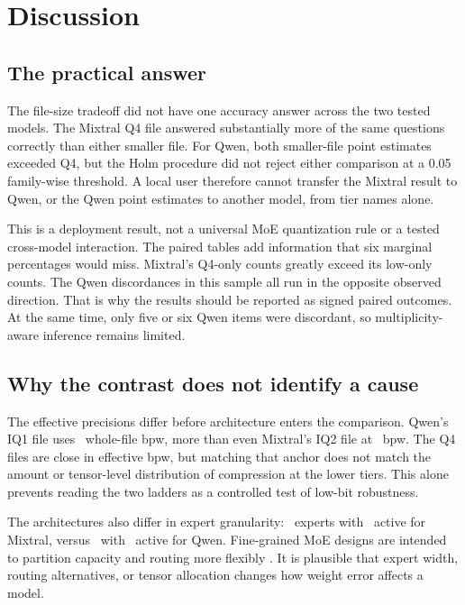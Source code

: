 \documentclass[11pt]{article}
\begin{document}
\section{Discussion}

\subsection{The practical answer}

The file-size tradeoff did not have one accuracy answer across the two tested
models. The Mixtral Q4 file answered substantially more of the same questions
correctly than either smaller file. For Qwen, both smaller-file point
estimates exceeded Q4, but the Holm procedure did not reject either comparison
at a 0.05 family-wise threshold. A local user therefore cannot transfer the
Mixtral result to Qwen, or the Qwen point estimates to another model, from
tier names alone.

This is a deployment result, not a universal MoE quantization rule or a tested
cross-model interaction. The paired tables add information that six marginal
percentages would miss.
Mixtral's Q4-only counts greatly exceed its low-only counts. The Qwen
discordances in this sample all run in the opposite observed direction. That
is why the results should be reported as signed paired outcomes. At the same
time, only five or six Qwen items were discordant, so multiplicity-aware
inference remains limited.

\subsection{Why the contrast does not identify a cause}

The effective precisions differ before architecture enters the comparison.
Qwen's IQ1 file uses \PfourQwenMoeIqOneEffectiveBpw\ whole-file bpw,
more than even Mixtral's IQ2 file at \PfourMixtralIqTwoEffectiveBpw\ bpw.
The Q4 files are close in effective bpw, but matching that anchor does not
match the amount or tensor-level distribution of compression at the lower
tiers. This alone prevents reading the two ladders as a controlled test of
low-bit robustness.

The architectures also differ in expert granularity:
\PfourMixtralExperts\ experts with \PfourMixtralActiveExperts\ active for
Mixtral, versus \PfourQwenMoeExperts\ with
\PfourQwenMoeActiveExperts\ active for Qwen. Fine-grained MoE designs are
intended to partition capacity and routing more flexibly
\citep{dai2024deepseekmoe,qwen2025qwen3}. It is plausible that expert width,
routing alternatives, or tensor allocation changes how weight error affects a
model.
\end{document}
